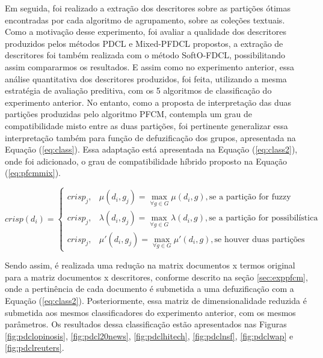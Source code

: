 Em seguida, foi realizado a extração dos descritores sobre as partições ótimas encontradas por
cada algoritmo de agrupamento, sobre as coleções textuais. Como a motivação desse experimento, foi
avaliar a qualidade dos descritores produzidos pelos métodos PDCL e Mixed-PFDCL propostos, a extração
de descritores foi também realizada com o método SoftO-FDCL, possibilitando assim compararmos os
resultados. E assim como no experimento anterior, essa análise quantitativa dos descritores
produzidos, foi feita, utilizando a mesma estratégia de avaliação preditiva,
com os 5 algoritmos de classificação do experimento anterior. No entanto, como a proposta de
interpretação das duas partições produzidas pelo algoritmo PFCM, contempla um grau de
compatibilidade misto entre as duas partições, foi pertinente generalizar essa interpretação
também para função de defuzificação dos grupos, apresentada na Equação
(\ref{eq:class}). Essa adaptação está apresentada na Equação (\ref{eq:class2}), onde 
foi adicionado, o grau de compatibilidade híbrido proposto na Equação (\ref{eq:pfcmmix}).

\begin{equation}
  crisp(d_i) = \begin{cases}
    crisp_j, & \mu(d_i,g_j) = \displaystyle\max_{\forall g \in G} \mu(d_i,g), \text{se a partição
  for fuzzy}\\
  crisp_j, & \lambda(d_i,g_j) = \displaystyle\max_{\forall g \in G} \lambda(d_i,g), \text{se a
  partição for possibilística}\\
  crisp_j, & \mu'(d_i,g_j) = \displaystyle\max_{\forall g \in G} \mu'(d_i,g), \text{se houver
duas partições}
  \end{cases}
  \label{eq:class2}
\end{equation}

Sendo assim, é realizada uma redução na matrix documentos x termos original para a matriz documentos
x descritores, conforme descrito na seção \ref{sec:exppfcm}, onde a pertinência de cada documento é
submetida a uma defuzificação com a Equação (\ref{eq:class2}). Posteriormente, essa matriz de
dimensionalidade reduzida é submetida aos mesmos classificadores do experimento anterior, com os
mesmos parâmetros. Os resultados dessa classificação estão apresentados nas Figuras
\ref{fig:pdclopinosis}, \ref{fig:pdcl20news}, \ref{fig:pdclhitech}, \ref{fig:pdclnsf},
\ref{fig:pdclwap} e \ref{fig:pdclreuters}.

